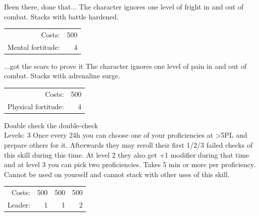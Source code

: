 \begin{skill}{Been there{,} done that...}
	\setlength{\parskip}{8pt}
	\setlength{\parindent}{0pt}
	The character ignores one level of fright in and out of combat. Stacks with battle hardened.\\

	\hfill
	\begin{tabular}{rr}
		Costs: & 500 \\
		Mental fortitude: & 4 \\
	\end{tabular}
\end{skill}

\begin{skill}{...got the scars to prove it}
	\setlength{\parskip}{8pt}
	\setlength{\parindent}{0pt}
	The character ignores one level of pain in and out of combat. Stacks with adrenaline surge.\\

	\hfill
	\begin{tabular}{rr}
		Costs: & 500 \\
		Physical fortitude: & 4 \\
	\end{tabular}
\end{skill}

\begin{skill}{Double check the double-check \\\phantom{a}\hfill Levels: 3}
	\setlength{\parskip}{8pt}
	\setlength{\parindent}{0pt}
	Once every 24h you can choose one of your proficiencies at >5PL and prepare others for it. Afterwards they may reroll their first 1/2/3 failed checks of this skill during this time. At level 2 they also get +1 modifier during that time and at level 3 you can pick two proficiencies. Takes 5 min or more per proficiency. Cannot be used on yourself and cannot stack with other uses of this skill.\\

	\hfill
	\begin{tabular}{rrrr}
		Costs: & 500 & 500 & 500 \\
		Leader: & 1 & 1 & 2 \\
	\end{tabular}
\end{skill}

